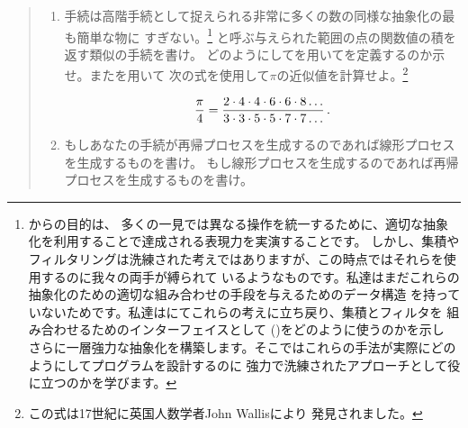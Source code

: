 \begin{quote}
 \begin{enumerate}[a]

\item
{}手続は高階手続として捉えられる非常に多くの数の同様な抽象化の最も簡単な物に
すぎない。\footnote{からの目的は、
多くの一見では異なる操作を統一するために、適切な抽象化を利用することで達成される表現力を実演することです。
しかし、集積やフィルタリングは洗練された考えではありますが、この時点ではそれらを使用するのに我々の両手が縛られて
いるようなものです。私達はまだこれらの抽象化のための適切な組み合わせの手段を与えるためのデータ構造
を持っていないためです。私達はにてこれらの考えに立ち戻り、集積とフィルタを
組み合わせるためのインターフェイスとして ()をどのように使うのかを示し
さらに一層強力な抽象化を構築します。そこではこれらの手法が実際にどのようにしてプログラムを設計するのに
強力で洗練されたアプローチとして役に立つのかを学びます。}
と呼ぶ与えられた範囲の点の関数値の積を返す類似の手続を書け。
どのようにしてを用いてを定義するのか示せ。またを用いて
次の式を使用して\( \pi \)の近似値を計算せよ。\footnote{この式は17世紀に英国人数学者John Wallisにより
発見されました。}

\begin{comment}

\begin{example}
pi   2 * 4 * 4 * 6 * 6 * 8 ...
-- = -------------------------
 4   3 * 3 * 5 * 5 * 7 * 7 ...
\end{example}

\end{comment}
\begin{displaymath}
 {\pi\over 4} = {2\cdot 4\cdot 4\cdot 6\cdot 6\cdot 8\dots\over 
		   3\cdot 3\cdot 5\cdot 5\cdot 7\cdot 7\dots}\,. 
\end{displaymath}
\item
もしあなたの手続が再帰プロセスを生成するのであれば線形プロセスを生成するものを書け。
もし線形プロセスを生成するのであれば再帰プロセスを生成するものを書け。

\end{enumerate}
\end{quote}

